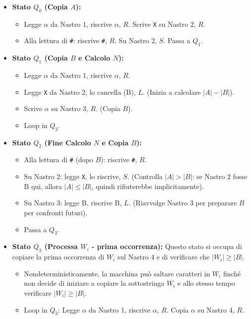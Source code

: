 \documentclass[a4paper, 11pt]{book} %
\theoremstyle{definition}
\newcommand{\B}{\text{B}} %
\begin{document}
\begin{itemize}
    \item \textbf{Stato $Q_0$ (Copia $A$):}
        \begin{itemize}
            \item Legge $\alpha$ da Nastro 1, riscrive $\alpha$, $R$. Scrive \texttt{X} su Nastro 2, $R$.
            \item Alla lettura di \texttt{\#}: riscrive \texttt{\#}, $R$. Su Nastro 2, $S$. Passa a $Q_1$.
        \end{itemize}
    \item \textbf{Stato $Q_1$ (Copia $B$ e Calcolo $N$):}
        \begin{itemize}
            \item Legge $\alpha$ da Nastro 1, riscrive $\alpha$, $R$.
            \item Legge \texttt{X} da Nastro 2, lo cancella ($\B$), $L$. (Inizia a calcolare $|A|-|B|$).
            \item Scrive $\alpha$ su Nastro 3, $R$. (Copia $B$).
            \item Loop in $Q_2$.
        \end{itemize}
    \item \textbf{Stato $Q_2$ (Fine Calcolo $N$ e Copia $B$):}
        \begin{itemize}
            \item Alla lettura di \texttt{\#} (dopo $B$): riscrive \texttt{\#}, $R$.
            \item Su Nastro 2: legge \texttt{X}, lo riscrive, $S$. (Controlla $|A|>|B|$: se Nastro 2 fosse $\B$ qui, allora $|A| \le |B|$, quindi rifiuterebbe implicitamente).
            \item Su Nastro 3: legge $\B$, riscrive $\B$, $L$. (Riavvolge Nastro 3 per preparare $B$ per confronti futuri).
            \item Passa a $Q_3$.
        \end{itemize}
    \item \textbf{Stato $Q_3$ (Processa $W_i$ - prima occorrenza):}
        Questo stato si occupa di copiare la prima occorrenza di $W_i$ sul Nastro 4 e di verificare che $|W_i| \ge |B|$.
        \begin{itemize}
            \item Nondeterministicamente, la macchina può saltare caratteri in $W_i$ finché non decide di iniziare a copiare la sottostringa $W_i$ e allo stesso tempo verificare $|W_i| \ge |B|$.
            \item Loop in $Q_3$: Legge $\alpha$ da Nastro 1, riscrive $\alpha$, $R$. Copia $\alpha$ su Nastro 4, $R$.

\end{itemize}
\end{itemize}
\end{document}
